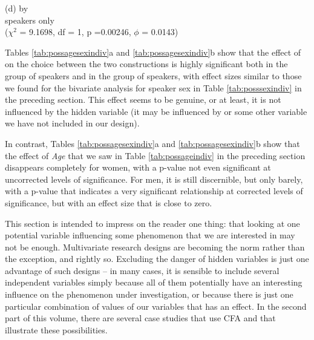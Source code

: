\begin{table}[!htbp]
\begin{minipage}{.45\textwidth}
\footnotesize{(d)  by } \\
\footnotesize{ speakers only} \\
\tiny{($\chi^2$ = 9.1698, df = 1, p =0.00246, $\phi$ = 0.0143)}
\end{minipage}
\end{table}

Tables \ref{tab:possagesexindiv}a and \ref{tab:possagesexindiv}b show that the effect of  on the choice between the two constructions is highly significant both in the group of  speakers and in the group of  speakers, with effect sizes similar to those we found for the bivariate analysis for speaker sex in Table \ref{tab:posssexindiv} in the preceding section. This effect seems to be genuine, or at least, it is not influenced by the hidden variable  (it may be influenced by  or some other variable we have not included in our design).

In contrast, Tables \ref{tab:possagesexindiv}a and \ref{tab:possagesexindiv}b show that the effect of \textit{Age} that we saw in Table \ref{tab:possageindiv} in the preceding section disappears completely for women, with a p-value not even significant at uncorrected levels of significance. For men, it is still discernible, but only barely, with a p-value that indicates a very significant relationship at corrected levels of significance, but with an effect size that is close to zero.

This section is intended to impress on the reader one thing: that looking at one potential variable influencing some phenomenon that we are interested in may not be enough. Multivariate research designs are becoming the norm rather than the exception, and rightly so. Excluding the danger of hidden variables is just one advantage of such designs -- in many cases, it is sensible to include several independent variables simply because all of them potentially have an interesting influence on the phenomenon under investigation, or because there is just one particular combination of values of our variables that has an effect. In the second part of this volume, there are several case studies that use CFA and that illustrate these possibilities.

